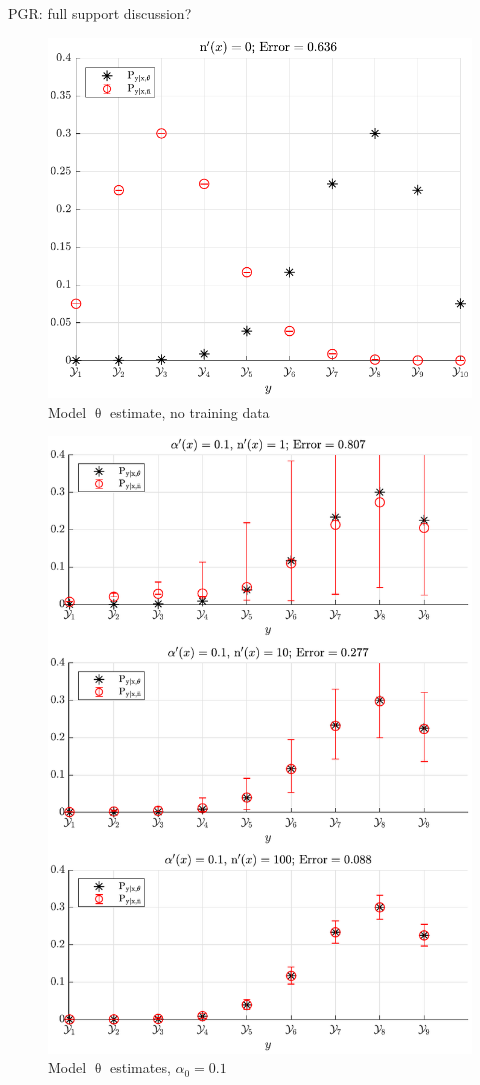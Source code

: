 \documentclass[12pt]{report}
\begin{document}
PGR: full support discussion?


\begin{figure}
\centering
\includegraphics[width=0.7\linewidth]{P_yx_error_N_0.pdf}
\caption{Model $\uptheta$ estimate, no training data}
\label{fig:P_yx_error_N_0}
\end{figure}

\begin{figure}
\centering
\includegraphics[width=0.7\linewidth]{P_yx_error_a0_0_1.pdf}
\caption{Model $\uptheta$ estimates, $\alpha_0 = 0.1$}
\label{fig:P_yx_error_a0_0_1}
\end{figure}
\end{document}
